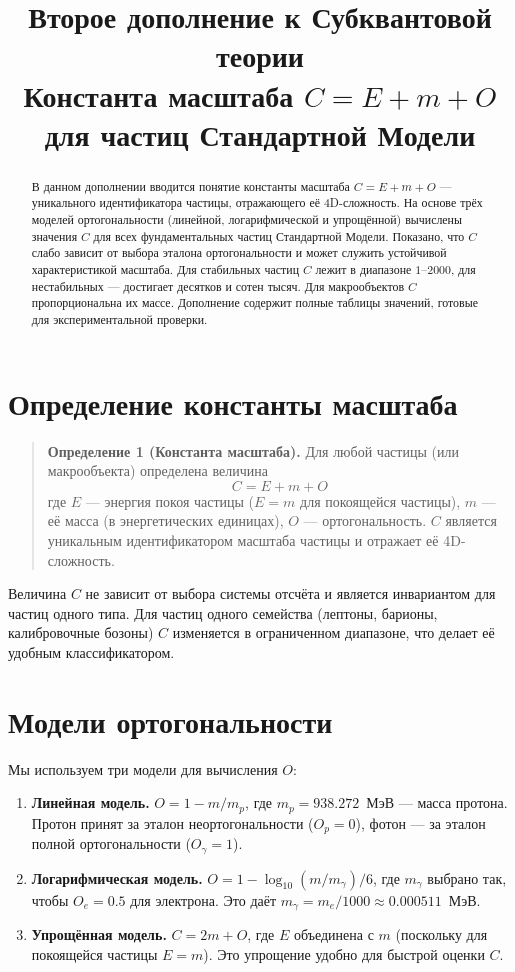 \documentclass[12pt,a4paper]{article}
\title{\textbf{Второе дополнение к Субквантовой теории}\\
\large Константа масштаба $C = E + m + O$ для частиц Стандартной Модели}
\author{}
\date{}
\begin{document}
\maketitle

\begin{abstract}
В данном дополнении вводится понятие константы масштаба $C = E + m + O$ --- уникального идентификатора частицы, отражающего её 4D-сложность. На основе трёх моделей ортогональности (линейной, логарифмической и упрощённой) вычислены значения $C$ для всех фундаментальных частиц Стандартной Модели. Показано, что $C$ слабо зависит от выбора эталона ортогональности и может служить устойчивой характеристикой масштаба. Для стабильных частиц $C$ лежит в диапазоне $1$--$2000$, для нестабильных --- достигает десятков и сотен тысяч. Для макрообъектов $C$ пропорциональна их массе. Дополнение содержит полные таблицы значений, готовые для экспериментальной проверки.
\end{abstract}

\section{Определение константы масштаба}

\begin{quote}
\textbf{Определение 1 (Константа масштаба).} Для любой частицы (или макрообъекта) определена величина
\begin{equation}
    C = E + m + O
\end{equation}
где $E$ --- энергия покоя частицы ($E = m$ для покоящейся частицы), $m$ --- её масса (в энергетических единицах), $O$ --- ортогональность. $C$ является уникальным идентификатором масштаба частицы и отражает её 4D-сложность.
\end{quote}

Величина $C$ не зависит от выбора системы отсчёта и является инвариантом для частиц одного типа. Для частиц одного семейства (лептоны, барионы, калибровочные бозоны) $C$ изменяется в ограниченном диапазоне, что делает её удобным классификатором.

\section{Модели ортогональности}

Мы используем три модели для вычисления $O$:

\begin{enumerate}[label=\textbf{Модель \Alph*:}]
    \item \textbf{Линейная модель.} $O = 1 - m/m_p$, где $m_p = 938.272$~МэВ --- масса протона. Протон принят за эталон неортогональности ($O_p = 0$), фотон --- за эталон полной ортогональности ($O_\gamma = 1$).
    \item \textbf{Логарифмическая модель.} $O = 1 - \log_{10}(m/m_\gamma) / 6$, где $m_\gamma$ выбрано так, чтобы $O_e = 0.5$ для электрона. Это даёт $m_\gamma = m_e / 1000 \approx 0.000511$~МэВ.
    \item \textbf{Упрощённая модель.} $C = 2m + O$, где $E$ объединена с $m$ (поскольку для покоящейся частицы $E = m$). Это упрощение удобно для быстрой оценки $C$.
\end{enumerate}
\end{document}
